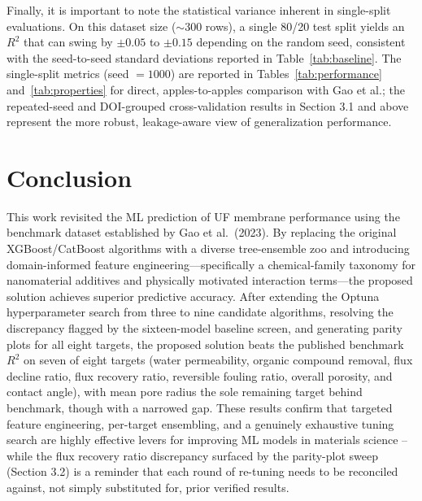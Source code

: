 \documentclass[11pt]{article}
\begin{document}
Finally, it is important to note the statistical variance inherent in single-split evaluations. On this dataset size ($\sim$300 rows), a single 80/20 test split yields an $R^2$ that can swing by $\pm 0.05$ to $\pm 0.15$ depending on the random seed, consistent with the seed-to-seed standard deviations reported in Table~\ref{tab:baseline}. The single-split metrics (seed $= 1000$) are reported in Tables~\ref{tab:performance} and~\ref{tab:properties} for direct, apples-to-apples comparison with Gao et al.; the repeated-seed and DOI-grouped cross-validation results in Section 3.1 and above represent the more robust, leakage-aware view of generalization performance.

\section{Conclusion}

This work revisited the ML prediction of UF membrane performance using the benchmark dataset established by Gao et al.\ (2023). By replacing the original XGBoost/CatBoost algorithms with a diverse tree-ensemble zoo and introducing domain-informed feature engineering---specifically a chemical-family taxonomy for nanomaterial additives and physically motivated interaction terms---the proposed solution achieves superior predictive accuracy. After extending the Optuna hyperparameter search from three to nine candidate algorithms, resolving the discrepancy flagged by the sixteen-model baseline screen, and generating parity plots for all eight targets, the proposed solution beats the published benchmark $R^2$ on seven of eight targets (water permeability, organic compound removal, flux decline ratio, flux recovery ratio, reversible fouling ratio, overall porosity, and contact angle), with mean pore radius the sole remaining target behind benchmark, though with a narrowed gap. These results confirm that targeted feature engineering, per-target ensembling, and a genuinely exhaustive tuning search are highly effective levers for improving ML models in materials science -- while the flux recovery ratio discrepancy surfaced by the parity-plot sweep (Section 3.2) is a reminder that each round of re-tuning needs to be reconciled against, not simply substituted for, prior verified results.
\end{document}
